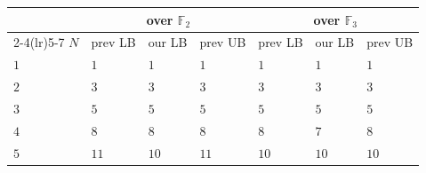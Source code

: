 \documentclass[11pt]{article}
\theoremstyle{definition}
\newcommand{\F}{\mathbb{F}}
\begin{document}
\begin{table}[!ht]
  \centering
  \setlength{\tabcolsep}{6pt}
  \begin{tabular}{lllllll}
    \toprule
    & \multicolumn{3}{c}{over $\F_2$}                           & \multicolumn{3}{c}{over $\F_3$}                                                                                                                                                                                                  \\
    \cmidrule(lr){2-4}\cmidrule(lr){5-7}
    $N$  & prev LB                                                   & our LB                          & prev UB                                                  & prev LB                                                   & our LB       & prev UB                                                  \\
    \midrule
    $1$  & $1$                                                       & $1$                             & $1$                                                      & $1$                                                       & $1$          & $1$                                                      \\
    $2$  & $3$~\cite{winograd1977some,alder1981algorithmic}          & $3$                             & $3$~\cite{toom1963complexity}                            & $3$~\cite{winograd1977some,alder1981algorithmic}          & $3$          & $3$~\cite{toom1963complexity}                            \\
    $3$  & $5$~\cite{winograd1977some,alder1981algorithmic}          & $5$                             & $5$~\cite{averbuch1991classification,blaser2005complete} & $5$~\cite{winograd1977some,alder1981algorithmic}          & $5$          & $5$~\cite{averbuch1991classification,blaser2005complete} \\
    $4$  & $8$~\cite{averbuch1991classification,blaser2005complete}  & $8$                             & $8$~\cite{cenk2011multiplication}                        & $8$~\cite{averbuch1991classification,blaser2005complete}  & $7$          & $8$~\cite{cenk2011multiplication}                        \\
    $5$  & $11$~\cite{covanov2019improved}                           & $10$                            & $11$~\cite{cenk2011multiplication}                       & $10$~\cite{averbuch1991classification,blaser2005complete} & $10$         & $10$~\cite{barbulescu2012finding}                        \\

\end{tabular}
\end{table}
\end{document}
